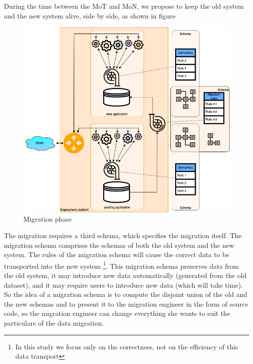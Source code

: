 \documentclass{elsarticle}
\begin{document}
   During the time between the MoT and MoN,
   we propose to keep the old system and the new system alive, side by side, as shown in figure
\begin{figure}[bht]
   \begin{center}
     \includegraphics[scale=.35]{datamigration-Migration phase.drawio.png}
   \end{center}
\caption{Migration phase}
\label{fig:migration phase}
\end{figure}

   The migration requires a third schema, which specifies the migration itself.
   The migration schema comprises the schemas of both the old system and the new system.
   The rules of the migration schema will cause the correct data to be transported into the new system%
\footnote{In this study we focus only on the correctness, not on the efficiency of this data transport}.
   This migration schema preserves data from the old system, it may introduce new data automatically (generated from the old dataset),
   and it may require users to introduce new data (which will take time). 
   So the idea of a migration schema is to compute the disjoint union of the old and the new schemas
   and to present it to the migration engineer in the form of source code,
   so the migration engineer can change everything she wants to suit the particulars of the data migration.
\end{document}
